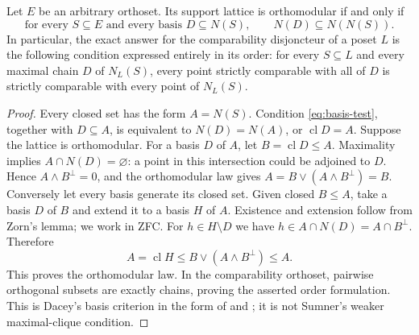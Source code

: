 \begin{theorem}\label{SA21-A03}
Let $E$ be an arbitrary orthoset. Its support lattice is orthomodular
if and only if
\begin{equation}\label{eq:basis-test}
 \text{for every }S\subseteq E\text{ and every basis }D\subseteq N(S),
 \qquad N(D)\subseteq N(N(S)).
\end{equation}
In particular, the exact answer for the comparability disjoncteur of a
poset $L$ is the following condition expressed entirely in its order:
for every $S\subseteq L$ and every maximal chain $D$ of $N_L(S)$,
every point strictly comparable with all of $D$ is strictly comparable
with every point of $N_L(S)$.
\end{theorem}
\begin{proof}
Every closed set has the form $A=N(S)$. Condition
\eqref{eq:basis-test}, together with $D\subseteq A$, is equivalent to
$N(D)=N(A)$, or $\operatorname{cl}D=A$.
Suppose the lattice is orthomodular. For a basis $D$ of $A$, let
$B=\operatorname{cl}D\leq A$. Maximality implies
$A\cap N(D)=\varnothing$: a point in this intersection could be
adjoined to $D$. Hence $A\wedge B^\perp=0$, and the orthomodular law
gives $A=B\vee(A\wedge B^\perp)=B$.
Conversely let every basis generate its closed set. Given closed
$B\leq A$, take a basis $D$ of $B$ and extend it to a basis $H$ of $A$.
Existence and extension follow from Zorn's lemma; we work in ZFC.
For $h\in H\setminus D$ we have $h\in A\cap N(D)=A\cap B^\perp$.
Therefore
\[
 A=\operatorname{cl}H\leq B\vee(A\wedge B^\perp)\leq A.
\]
This proves the orthomodular law. In the comparability orthoset,
pairwise orthogonal subsets are exactly chains, proving the asserted
order formulation. This is Dacey's basis criterion in the form of
\citet[Theorem 3.3]{Jenca2022} and
\citet[Lemma 2.11]{PasekaVetterlein2022}; it is not Sumner's weaker
maximal-clique condition.
\end{proof}

